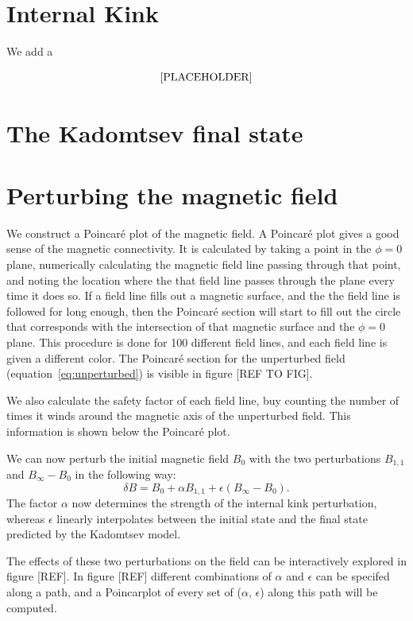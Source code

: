 \documentclass[%
superscriptaddress,
amsmath,amssymb,
aps,
pre,
floatfix,
]{revtex4-2}
\begin{document}
\section*{Internal Kink}
We add a

\begin{equation}\label{eq:kinky}
{\rm[PLACEHOLDER]}
\end{equation}

\section*{The Kadomtsev final state}

\section{Perturbing the magnetic field}


We construct a Poincar\'e plot of the magnetic field. 
A Poincar\'e plot gives a good sense of the magnetic connectivity. 
It is calculated by taking a point in the $\phi=0$ plane, numerically calculating the magnetic field line passing through that point, and noting the location where the that field line passes through the plane every time it does so. 
If a field line fills out a magnetic surface, and the the field line is followed for long enough, then the Poincar\'e section will start to fill out the circle that corresponds with the intersection of that magnetic surface and the $\phi=0$ plane. 
This procedure is done for 100 different field lines, and each field line is given a different color.
The Poincar\'e section for the unperturbed field (equation~\eqref{eq:unperturbed}) is visible in figure [REF TO FIG]. 

We also calculate the safety factor of each field line, buy counting the number of times it winds around the magnetic axis of the unperturbed field. 
This information is shown below the Poincar\'e plot. 

We can now perturb the initial magnetic field $B_0$ with the two perturbations $B_{1,1}$ and $B_\infty -B_0$ in the following way: 
\begin{equation}\label{eq:totalfield}
    \delta B =  B_0 + \alpha B_{1,1}+ \epsilon (B_\infty -B_0). 
\end{equation}
The factor $\alpha$ now determines the strength of the internal kink perturbation, whereas $\epsilon$ linearly interpolates between the initial state and the final state predicted by the Kadomtsev model. 

The effects of these two perturbations on the field can be interactively explored in figure [REF]. 
In figure [REF] different combinations of $\alpha$ and $\epsilon$ can be specifed along a path, and a Poincar\e plot of every set of ($\alpha$, $\epsilon$) along this path will be computed. 
\end{document}
